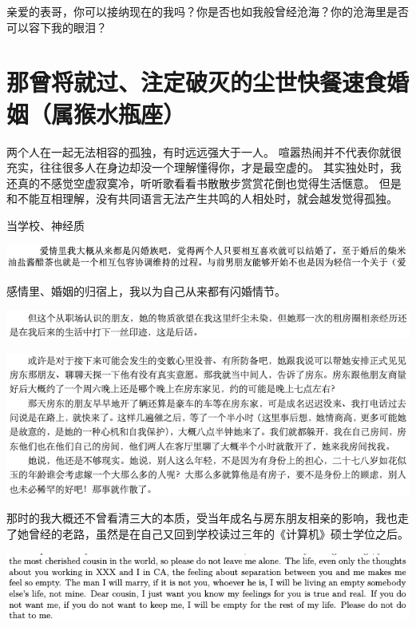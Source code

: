 \documentclass[9pt, b5paper]{article}
\begin{document}
亲爱的表哥，你可以接纳现在的我吗？你是否也如我般曾经沧海？你的沧海里是否可以容下我的眼泪？

\section{那曾将就过、注定破灭的尘世快餐速食婚姻（属猴水瓶座）}
\label{sec:org9b9c2d2}
两个人在一起无法相容的孤独，有时远远强大于一人。
喧嚣热闹并不代表你就很充实，往往很多人在身边却没一个理解懂得你，才是最空虚的。
其实独处时，我还真的不感觉空虚寂寞冷，听听歌看看书散散步赏赏花倒也觉得生活惬意。
但是和不能互相理解，没有共同语言无法产生共鸣的人相处时，就会越发觉得孤独。

当学校、神经质

\begin{center}
\includegraphics[width=.9\linewidth]{./pic/backups_plans_20210423_203401.png}
\end{center}

感情里、婚姻的归宿上，我以为自己从来都有闪婚情节。

\begin{center}
\includegraphics[width=.9\linewidth]{./pic/backups_plans_20210423_204215.png}
\end{center}

\begin{center}
\includegraphics[width=.9\linewidth]{./pic/backups_plans_20210423_204134.png}
\end{center}

那时的我大概还不曾看清三大的本质，受当年成名与房东朋友相亲的影响，我也走了她曾经的老路，虽然是在自己又回到学校读过三年的《计算机》硕士学位之后。

\begin{center}
\includegraphics[width=.9\linewidth]{./pic/backups_plans_20210423_201706.png}
\end{center}
\end{document}
